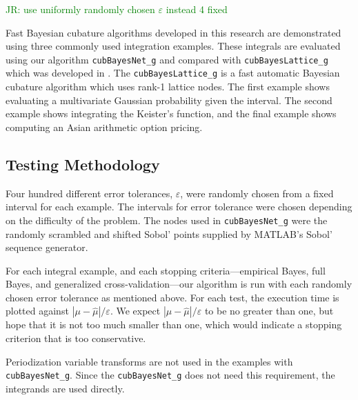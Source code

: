 \documentclass{svjour3}                     %
\newcommand{\hmu}{\widehat{\mu}}
\newcommand{\code}[1]{\texttt{#1}}
\def\abs#1{\ensuremath{\left \lvert #1 \right \rvert}}
\newcommand\secref{Section~\ref}
\newcommand{\JRNote}[1]{{\textcolor{green}{JR: #1}}}
\begin{document}
\label{sec:NumExp}

\JRNote{use uniformly randomly chosen $\varepsilon$ instead 4 fixed}

Fast Bayesian cubature algorithms developed in this research are demonstrated using three commonly used integration examples.
These integrals are evaluated using our algorithm \code{cubBayesNet\_g} and compared with \code{cubBayesLattice\_g} which was developed in \cite{JagHic19a}. The \code{cubBayesLattice\_g} is a fast automatic Bayesian cubature algorithm which uses rank-1 lattice nodes. The first example shows evaluating a multivariate Gaussian probability given the interval. The second example shows integrating the Keister's function, and the final example shows computing an Asian arithmetic option pricing.  


\subsection{Testing Methodology}
\label{sec:numerical_experiments_cubBayesLattice}

Four hundred different error tolerances, $\varepsilon$, were randomly chosen from a fixed interval  for each example. 
The intervals for error tolerance were chosen depending on the difficulty of the problem.
The nodes used in \code{cubBayesNet\_g} were the randomly scrambled and shifted Sobol' points supplied by MATLAB's Sobol' sequence generator. 

For each integral example, and each stopping criteria---empirical Bayes, full Bayes, and generalized cross-validation---our algorithm is run with each randomly chosen error tolerance as mentioned above.  For each test, the execution time is plotted against $\abs{\mu - \hmu}/\varepsilon$.  We expect $\abs{\mu - \hmu}/\varepsilon$ to be no greater than one, but hope that it is not too much smaller than one, which would indicate a stopping criterion that is too conservative.


Periodization variable transforms are not used in the examples with \\ \allowbreak \code{cubBayesNet\_g}. Since the \allowbreak \code{cubBayesNet\_g} does not need this requirement, the integrands are used directly.
\end{document}
